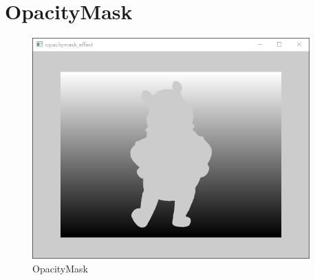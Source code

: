﻿




\FloatBarrier
\section{
OpacityMask
}\label{c000015s000025}


\begin{figure}[htb] %
\marginnote{\setlength\fboxsep{2pt}\fbox{\footnotesize{\kaishu\figurename\,}\footnotesize{\ref{p000041}}}}\centering %
\includegraphics[width=0.95\textwidth]{../chapter06/opacitymask_effect/the_app.png} %
\caption{OpacityMask} %
\label{p000041} %
\end{figure}


